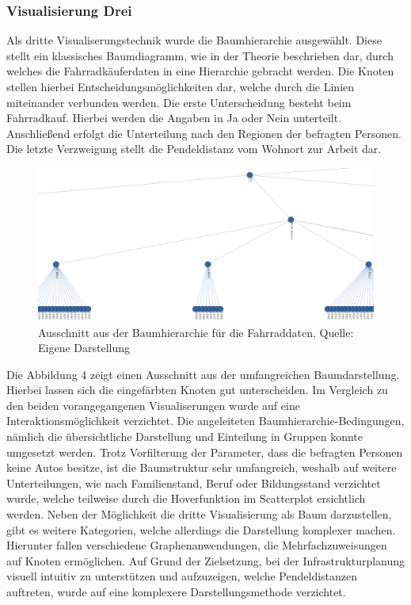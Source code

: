 \documentclass[usegeometry=true]{scrartcl}
\begin{document}
\subsubsection{Visualisierung Drei}
Als dritte Visualiserungstechnik wurde die Baumhierarchie ausgewählt. Diese stellt ein klassisches Baumdiagramm, wie in der Theorie beschrieben dar, durch welches die Fahrradkäuferdaten in eine Hierarchie gebracht werden. Die Knoten stellen hierbei Entscheidungsmöglichkeiten dar, welche durch die Linien miteinander verbunden werden. Die erste Unterscheidung besteht beim Fahrradkauf. Hierbei werden die Angaben in Ja oder Nein unterteilt. Anschließend erfolgt die Unterteilung nach den Regionen der befragten Personen. Die letzte Verzweigung stellt die Pendeldistanz vom Wohnort zur Arbeit dar. 
\begin{figure}[h]
\begin{center}
\includegraphics[width=12cm]{Bilder/V3Baumhierarchie.png}
\caption{Ausschnitt aus der Baumhierarchie für die Fahrraddaten, Quelle: Eigene Darstellung}
\end{center}
\end{figure}
\newline
Die Abbildung 4 zeigt einen Ausschnitt aus der umfangreichen Baumdarstellung. Hierbei lassen sich die eingefärbten Knoten gut unterscheiden. Im Vergleich zu den beiden vorangegangenen Visualiserungen wurde auf eine Interaktionsmöglichkeit verzichtet. Die angeleiteten Baumhierarchie-Bedingungen, nämlich die übersichtliche Darstellung und Einteilung in Gruppen konnte umgesetzt werden. Trotz Vorfilterung der Parameter, dass die befragten Personen keine Autos besitze, ist die Baumstruktur sehr umfangreich, weshalb auf weitere Unterteilungen, wie nach Familienstand, Beruf oder Bildungsstand verzichtet wurde, welche teilweise durch die Hoverfunktion im Scatterplot ersichtlich werden. Neben der Möglichkeit die dritte Visualisierung als Baum darzustellen, gibt es weitere Kategorien, welche allerdings die Darstellung komplexer machen. Hierunter fallen verschiedene Graphenanwendungen, die Mehrfachzuweisungen auf Knoten ermöglichen. Auf Grund der Zielsetzung, bei der Infrastrukturplanung visuell intuitiv zu unterstützen und aufzuzeigen, welche Pendeldistanzen auftreten, wurde auf eine komplexere Darstellungsmethode verzichtet. 
\end{document}
